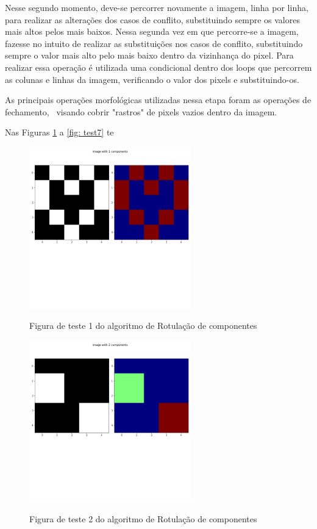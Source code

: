 \documentclass{article}
\begin{document}
Nesse segundo momento, deve-se percorrer novamente a imagem, linha por linha, para realizar as alterações dos casos de conflito, substituindo sempre os valores mais altos pelos mais baixos. Nessa segunda vez em que percorre-se a imagem, fazesse no intuito de realizar as substituições nos casos de conflito, substituindo sempre o valor mais alto pelo mais baixo dentro da vizinhança do pixel. Para realizar essa operação é utilizada uma condicional dentro dos loops que percorrem as colunas e linhas da imagem, verificando o valor dos pixels e substituindo-os. 

As principais operações morfológicas utilizadas nessa etapa foram as operações de fechamento,  visando cobrir "rastros" de pixels vazios dentro da imagem. 

Nas Figuras \ref{fig: test1} a \ref{fig: test7} te

\begin{figure}[!ht]
	\begin{minipage}[b]{1.0\linewidth}
		\centering
		\centerline{\includegraphics[width=7cm]{Figures/test1.png}}
		\label{fig: test1}
		\vspace{-2.0cm}		
		\centerline{Figura de teste 1 do algoritmo de Rotulação de componentes}\medskip
			
	\end{minipage}

\end{figure}

\begin{figure}[!ht]
	\begin{minipage}[b]{1.0\linewidth}
		\centering
		\centerline{\includegraphics[width=7cm]{Figures/test2.png}}
		\label{fig: test2}
		\vspace{-2.0cm}
		\centerline{Figura de teste 2 do algoritmo de Rotulação de componentes}\medskip
	\end{minipage}	
\end{figure}
\end{document}
